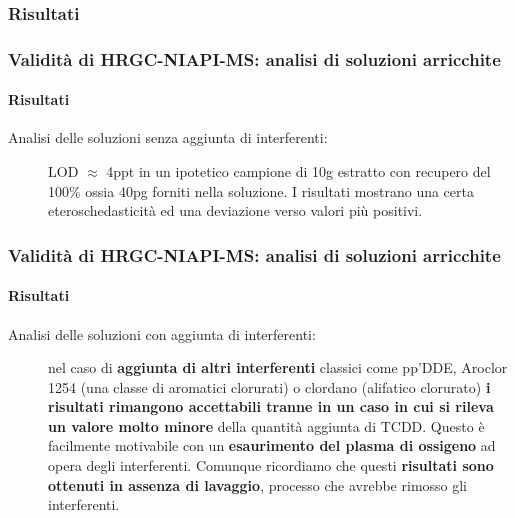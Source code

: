 \subsubsection{Risultati}\begin{frame}\frametitle{Validità di HRGC-NIAPI-MS: analisi di soluzioni arricchite}\framesubtitle{Risultati}\pause
\begin{description}

\item [{Analisi delle soluzioni senza aggiunta di interferenti:}] LOD $\approx$ 4ppt in un ipotetico campione di 10g estratto con recupero del 100\% ossia 40pg forniti nella soluzione. I risultati mostrano una certa eteroschedasticità ed una deviazione verso valori più positivi.
\end{description}
\begin{figure}{}\end{figure}


\end{frame}


\begin{frame}\frametitle{Validità di HRGC-NIAPI-MS: analisi di soluzioni arricchite}\framesubtitle{Risultati}
\begin{description}

\item [{Analisi delle soluzioni con aggiunta di interferenti:}]\pause nel caso di  {\bf aggiunta di altri interferenti} classici come pp'DDE, Aroclor 1254 (una classe di   aromatici clorurati) o clordano (alifatico clorurato)  {\bf i risultati rimangono accettabili tranne in un caso in cui si rileva un valore molto minore} della quantità aggiunta di TCDD. Questo è facilmente motivabile con un  {\bf esaurimento del plasma di ossigeno} ad opera degli interferenti. Comunque ricordiamo che questi  {\bf risultati sono ottenuti in assenza di lavaggio}, processo che avrebbe rimosso gli interferenti.

\end{description}





\end{frame}


